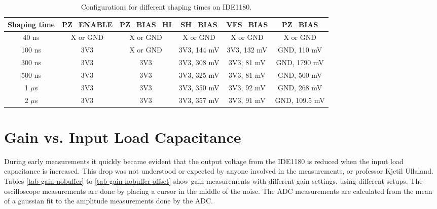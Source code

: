 \documentclass[../main/thesis.tex]{subfiles}
\begin{document}
\begin{table}[h!]
	\centering
	\caption{Configurations for different shaping times on IDE1180.}
	\label{tab-ide-shaping}
	\begin{tabular}{cccccc}\toprule
		\textbf{Shaping time} & \textbf{PZ\_ENABLE} & \textbf{PZ\_BIAS\_HI} & \textbf{SH\_BIAS}  & \textbf{VFS\_BIAS} & \textbf{PZ\_BIAS}    \\ \midrule
		40 ns        & X or GND          & X or GND            & X or GND        & X or GND        & X or GND          \\
		100 ns       & 3V3          & X or GND            & 3V3, 144 mV & 3V3, 132 mV  & GND, 110 mV   \\
		300 ns       & 3V3          & 3V3            & 3V3, 308 mV & 3V3, 81 mV  & GND, 1790 mV   \\
		500 ns       & 3V3          & 3V3            & 3V3, 325 mV & 3V3, 81 mV  & GND, 500 mV   \\
		1 $\mu$s     & 3V3          & 3V3            & 3V3, 350 mV & 3V3, 92 mV  & GND, 268 mV   \\
		2 $\mu$s     & 3V3          & 3V3            & 3V3, 357 mV & 3V3, 91 mV  & GND, 109.5 mV \\ \bottomrule
	\end{tabular}
\end{table}

\section{Gain vs. Input Load Capacitance}
\label{ide-gain}

During early measurements it quickly became evident that the output voltage from the IDE1180 is reduced when the input load capacitance is increased. This drop was not understood or expected by anyone involved in the measurements, or professor Kjetil Ullaland. Tables \ref{tab-gain-nobuffer} to \ref{tab-gain-nobuffer-offset} show gain measurements with different gain settings, using different setups. The oscilloscope measurements are done by placing a cursor in the middle of the noise. The ADC measurements are calculated from the mean of a gaussian fit to the amplitude measurements done by the ADC. 
\end{document}
